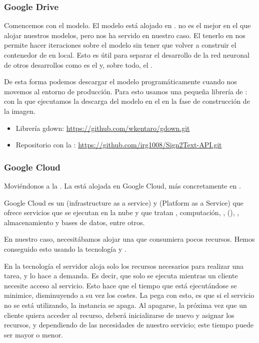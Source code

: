 \subsubsection{Google Drive}

Comencemos con el modelo. El modelo está alojado en .  no es el mejor  en el que alojar nuestros modelos, pero nos ha servido en nuestro caso. El tenerlo en  nos permite hacer iteraciones sobre el modelo sin tener que volver a construir el contenedor de  en local. Esto es útil para separar el desarrollo de la red neuronal de otros desarrollos como es el  y, sobre todo, el .

De esta forma podemos descargar el modelo programáticamente cuando nos movemos al entorno de producción. Para esto usamos una pequeña librería de :  con la que ejecutamos la descarga del modelo en el  en la fase de construcción de la imagen.

\begin{itemize}
  \item Librería gdown: \url{https://github.com/wkentaro/gdown.git}
  \item Repositorio  con la : \url{https://github.com/irg1008/Sign2Text-API.git}
\end{itemize}

\subsubsection{Google Cloud}

Moviéndonos a la . La  está alojada en Google Cloud, más concretamente en .

Google Cloud es un  (infrastructure as a service) y  (Platform as a Service) que ofrece servicios que se ejecutan en la nube y que tratan , computación, ,  (), , almacenamiento y bases de datos, entre otros.

En nuestro caso, necesitábamos alojar una  que consumiera pocos recursos. Hemos conseguido esto usando la tecnología  y .

En la tecnología  el servidor aloja solo los recursos necesarios para realizar una tarea, y lo hace a demanda. Es decir, que solo se ejecuta mientras un cliente necesite acceso al servicio. Esto hace que el tiempo que está ejecutándose se minimice, disminuyendo a su vez los costes. La pega con esto, es que si el servicio no se está utilizando, la instancia se apaga. Al apagarse, la próxima vez que un cliente quiera acceder al recurso, deberá inicializarse de nuevo y asignar los recursos, y dependiendo de las necesidades de nuestro servicio; este tiempo puede ser mayor o menor.

